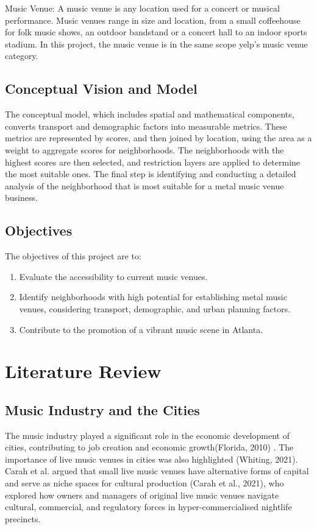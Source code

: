\documentclass[11pt]{article}
\begin{document}
Music Venue: A music venue is any location used for a concert or musical performance. Music venues range in size and location, from a small coffeehouse for folk music shows, an outdoor bandstand or a concert hall to an indoor sports stadium.  In this project, the music venue is in the same scope yelp's music venue category.


\subsection{Conceptual Vision and Model}
The conceptual model, which includes spatial and mathematical components, converts transport and demographic factors into measurable metrics. These metrics are represented by scores, and then joined by location, using the area as a weight to aggregate scores for neighborhoods. The neighborhoods with the highest scores are then selected, and restriction layers are applied to determine the most suitable ones. The final step is identifying and conducting a detailed analysis of the neighborhood that is most suitable for a metal music venue business.

\subsection{Objectives}
The objectives of this project are to:
\begin{enumerate}
\item{Evaluate the accessibility to current music venues.}
\item{Identify neighborhoods with high potential for establishing metal music venues, considering transport, demographic, and urban planning factors.}
\item{Contribute to the promotion of a vibrant music scene in Atlanta.}
\end{enumerate}

\section{Literature Review}

\subsection{Music Industry and the Cities}
The music industry played a significant role in the economic development of cities, contributing to job creation and economic growth(Florida, 2010) . The importance of live music venues in cities was also highlighted (Whiting, 2021). Carah et al. argued that small live music venues have alternative forms of capital and serve as niche spaces for cultural production (Carah et al., 2021), who explored how owners and managers of original live music venues navigate cultural, commercial, and regulatory forces in hyper-commercialised nightlife precincts.
\end{document}
